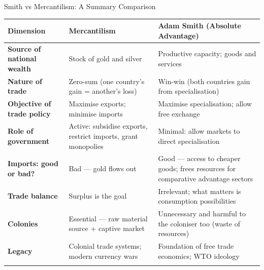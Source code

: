 \documentclass[
  ignorenonframetext,
  aspectratio=169,
]{beamer}
\makeatletter
\let\quarto@originallabel\label
\DeclareRobustCommand*{\label}[1]{\quarto@originallabel{#1}}
\makeatother
\begin{document}
\begin{frame}{Smith vs Mercantilism: A Summary Comparison}
\label{smith-vs-mercantilism-a-summary-comparison}
\begin{longtable}[]{@{}
  >{\raggedright\arraybackslash}p{}
  >{\raggedright\arraybackslash}p{}
  >{\raggedright\arraybackslash}p{}@{}}
\toprule\noalign{}
\begin{minipage}[b]{\linewidth}\raggedright
Dimension
\end{minipage} & \begin{minipage}[b]{\linewidth}\raggedright
Mercantilism
\end{minipage} & \begin{minipage}[b]{\linewidth}\raggedright
Adam Smith (Absolute Advantage)
\end{minipage} \\
\midrule\noalign{}
\endhead
\textbf{Source of national wealth} & Stock of gold and silver &
Productive capacity; goods and services \\
\textbf{Nature of trade} & Zero-sum (one country's gain = another's
loss) & Win-win (both countries gain from specialisation) \\
\textbf{Objective of trade policy} & Maximise exports; minimise imports
& Maximise specialisation; allow free exchange \\
\textbf{Role of government} & Active: subsidise exports, restrict
imports, grant monopolies & Minimal: allow markets to direct
specialisation \\
\textbf{Imports: good or bad?} & Bad --- gold flows out & Good ---
access to cheaper goods; frees resources for comparative advantage
sectors \\
\textbf{Trade balance} & Surplus is the goal & Irrelevant; what matters
is consumption possibilities \\
\textbf{Colonies} & Essential --- raw material source + captive market &
Unnecessary and harmful to the coloniser too (waste of resources) \\
\textbf{Legacy} & Colonial trade systems; modern currency wars &
Foundation of free trade economics; WTO ideology \\
\bottomrule\noalign{}
\end{longtable}
\end{frame}
\end{document}
